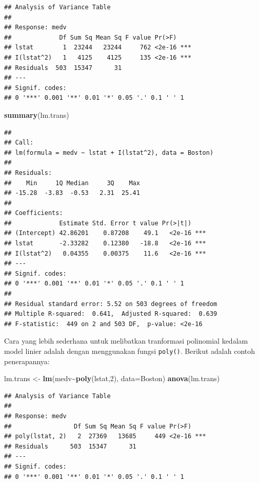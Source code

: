 \documentclass[
]{book}
\newenvironment{Shaded}{\begin{snugshade}}{\end{snugshade}}
\newcommand{\AttributeTok}[1]{\textcolor[rgb]{0.13,0.29,0.53}{#1}}
\newcommand{\DecValTok}[1]{\textcolor[rgb]{0.00,0.00,0.81}{#1}}
\newcommand{\FunctionTok}[1]{\textcolor[rgb]{0.13,0.29,0.53}{\textbf{#1}}}
\newcommand{\NormalTok}[1]{#1}
\newcommand{\OtherTok}[1]{\textcolor[rgb]{0.56,0.35,0.01}{#1}}
\newcommand{\SpecialCharTok}[1]{\textcolor[rgb]{0.81,0.36,0.00}{\textbf{#1}}}
\theoremstyle{definition}
\theoremstyle{definition}
\theoremstyle{definition}
\theoremstyle{definition}
\theoremstyle{remark}
\begin{document}
\begin{verbatim}
## Analysis of Variance Table
## 
## Response: medv
##             Df Sum Sq Mean Sq F value Pr(>F)    
## lstat        1  23244   23244     762 <2e-16 ***
## I(lstat^2)   1   4125    4125     135 <2e-16 ***
## Residuals  503  15347      31                   
## ---
## Signif. codes:  
## 0 '***' 0.001 '**' 0.01 '*' 0.05 '.' 0.1 ' ' 1
\end{verbatim}

\begin{Shaded}
\begin{Highlighting}[]
\FunctionTok{summary}\NormalTok{(lm.trans)}
\end{Highlighting}
\end{Shaded}

\begin{verbatim}
## 
## Call:
## lm(formula = medv ~ lstat + I(lstat^2), data = Boston)
## 
## Residuals:
##    Min     1Q Median     3Q    Max 
## -15.28  -3.83  -0.53   2.31  25.41 
## 
## Coefficients:
##             Estimate Std. Error t value Pr(>|t|)    
## (Intercept) 42.86201    0.87208    49.1   <2e-16 ***
## lstat       -2.33282    0.12380   -18.8   <2e-16 ***
## I(lstat^2)   0.04355    0.00375    11.6   <2e-16 ***
## ---
## Signif. codes:  
## 0 '***' 0.001 '**' 0.01 '*' 0.05 '.' 0.1 ' ' 1
## 
## Residual standard error: 5.52 on 503 degrees of freedom
## Multiple R-squared:  0.641,  Adjusted R-squared:  0.639 
## F-statistic:  449 on 2 and 503 DF,  p-value: <2e-16
\end{verbatim}

Cara yang lebih sederhana untuk melibatkan tranformasi polinomial kedalam model linier adalah dengan menggunakan fungsi \texttt{poly()}. Berikut adalah contoh penerapannya:

\begin{Shaded}
\begin{Highlighting}[]
\NormalTok{lm.trans }\OtherTok{\textless{}{-}} \FunctionTok{lm}\NormalTok{(medv}\SpecialCharTok{\textasciitilde{}}\FunctionTok{poly}\NormalTok{(lstat,}\DecValTok{2}\NormalTok{), }\AttributeTok{data=}\NormalTok{Boston)}
\FunctionTok{anova}\NormalTok{(lm.trans)}
\end{Highlighting}
\end{Shaded}

\begin{verbatim}
## Analysis of Variance Table
## 
## Response: medv
##                 Df Sum Sq Mean Sq F value Pr(>F)    
## poly(lstat, 2)   2  27369   13685     449 <2e-16 ***
## Residuals      503  15347      31                   
## ---
## Signif. codes:  
## 0 '***' 0.001 '**' 0.01 '*' 0.05 '.' 0.1 ' ' 1
\end{verbatim}
\end{document}
